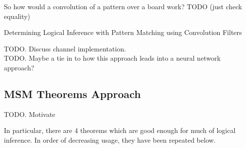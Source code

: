 So how would a convolution of a pattern over a board work? TODO (just check equality)\\

\begin{algorithm}[h]
\caption*{Determining Logical Inference with Pattern Matching using Convolution Filters}
\begin{algorithmic}
            \EndIf
        \EndFor
    \EndFor
\EndFor
{}
\EndFunction
\end{algorithmic}
\end{algorithm}

TODO. Discuss channel implementation.\\

TODO. Maybe a tie in to how this approach leads into a neural network approach?\\


\subsection{MSM Theorems Approach}

TODO. Motivate


In particular, there are 4 theorems which are good enough for much of logical inference. In order of decreasing usage, they have been repeated below.

